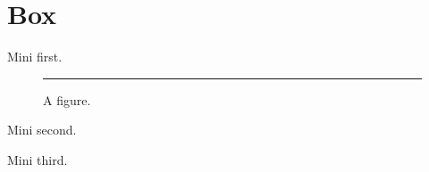 \documentclass{article}
\begin{document}
\section{Box}
\noindent\begin{minipage}{\columnwidth}
\noindent\hspace{8pt} Mini first.

\begin{figure}[H]\centering\rule{1cm}{1cm}\caption{A figure.}\end{figure}

\noindent\hspace{8pt} Mini second.
\vspace{0.5cm}

\noindent\hspace{8pt} Mini third.
\end{minipage}
\end{document}
